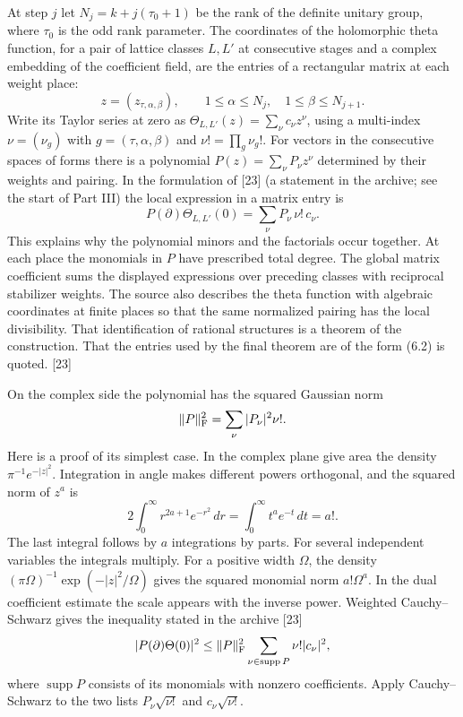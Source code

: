 \documentclass[11pt,letterpaper]{article}
\begin{document}
{At step $j$ let $N_j=k+j(\tau_0+1)$ be the rank of the definite unitary group, where $\tau_0$ is the odd rank parameter. The coordinates of the holomorphic theta function, for a pair of lattice classes $L,L'$ at consecutive stages and a complex embedding of the coefficient field, are the entries of a rectangular matrix at each weight place:
\begin{equation}\label{D:88}
 z=(z_{\tau,\alpha,\beta}),\qquad
 1\le\alpha\le N_j,\quad 1\le\beta\le N_{j+1}.
\end{equation}
Write its Taylor series at zero as $\Theta_{L,L'}(z)=\sum_{\nu}c_\nu z^\nu$, using a multi-index $\nu=(\nu_g)$ with $g=(\tau,\alpha,\beta)$ and $\nu!=\prod_g\nu_g!$. For vectors in the consecutive spaces of forms there is a polynomial $P(z)=\sum_\nu P_\nu z^\nu$ determined by their weights and pairing. In the formulation of [23] (a statement in the archive; see the start of Part III) the local expression in a matrix entry is
\begin{equation}\label{D:89}
 P(\partial)\Theta_{L,L'}(0)=\sum_{\nu} P_\nu\,\nu!\,c_\nu .       \tag{6.2}
\end{equation}
This explains why the polynomial minors and the factorials occur together. At each place the monomials in $P$ have prescribed total degree. The global matrix coefficient sums the displayed expressions over preceding classes with reciprocal stabilizer weights. The source also describes the theta function with algebraic coordinates at finite places so that the same normalized pairing has the local divisibility. That identification of rational structures is a theorem of the construction. That the entries used by the final theorem are of the form (6.2) is quoted. [23]

On the complex side the polynomial has the squared Gaussian norm
\begin{equation}\label{D:90}
 \|P\|_{\rm F}^2=\sum_\nu |P_\nu|^2\nu! .
\end{equation}
Here is a proof of its simplest case. In the complex plane give area the density $\pi^{-1}e^{-|z|^2}$. Integration in angle makes different powers orthogonal, and the squared norm of $z^a$ is
\begin{equation}\label{D:91}
 2\int_0^\infty r^{2a+1}e^{-r^2}\,dr
     =\int_0^\infty t^a e^{-t}\,dt=a! .
\end{equation}
The last integral follows by $a$ integrations by parts. For several independent variables the integrals multiply. For a positive width $\Omega$, the density $(\pi\Omega)^{-1}\exp(-|z|^2/\Omega)$ gives the squared monomial norm $a!\Omega^a$. In the dual coefficient estimate the scale appears with the inverse power. Weighted Cauchy--Schwarz gives the inequality stated in the archive [23]
\begin{equation}\label{D:92}
 |P(\partial)\Theta(0)|^2\le
    \|P\|_{\rm F}^2\sum_{\nu\in\operatorname{supp}P}\nu!|c_\nu|^2 ,
\end{equation}
where $\operatorname{supp}P$ consists of its monomials with nonzero coefficients. Apply Cauchy--Schwarz to the two lists $P_\nu\sqrt{\nu!}$ and $c_\nu\sqrt{\nu!}$.

}
\end{document}
